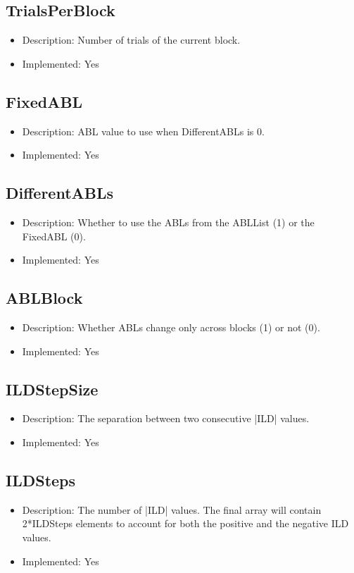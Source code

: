 \subsection*{TrialsPerBlock}
\begin{itemize}
	\item Description: Number of trials of the current block.
	\item Implemented: Yes
\end{itemize}

\subsection*{FixedABL}
\begin{itemize}
	\item Description: ABL value to use when DifferentABLs is 0.
	\item Implemented: Yes
\end{itemize}

\subsection*{DifferentABLs}
\begin{itemize}
	\item Description: Whether to use the ABLs from the ABLList (1) or the FixedABL (0).
	\item Implemented: Yes
\end{itemize}

\subsection*{ABLBlock}
\begin{itemize}
	\item Description: Whether ABLs change only across blocks (1) or not (0).
	\item Implemented: Yes
\end{itemize}

\subsection*{ILDStepSize}
\begin{itemize}
	\item Description: The separation between two consecutive |ILD| values.
	\item Implemented: Yes
\end{itemize}

\subsection*{ILDSteps}
\begin{itemize}
	\item Description: The number of |ILD| values. The final array will contain 2*ILDSteps elements to account for both the positive and the negative ILD values.
	\item Implemented: Yes
\end{itemize}

